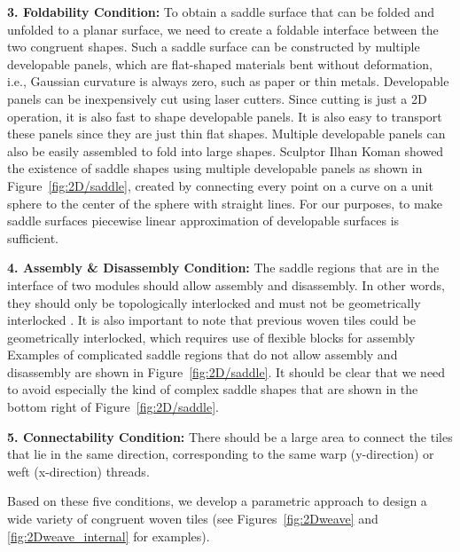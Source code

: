 \documentclass[times,twocolumn,final]{elsarticle}
\begin{document}
\noindent   \textbf{3. Foldability Condition:} To obtain a saddle surface that can be folded and unfolded to a planar surface, we need to create a foldable interface between the two congruent shapes. Such a saddle surface can be constructed by multiple developable panels, which are flat-shaped materials bent without deformation, i.e., Gaussian curvature is always zero, such as paper or thin metals. Developable panels can be inexpensively cut using laser cutters. Since cutting is just a 2D operation, it is also fast to shape developable panels.  It is also easy to transport these panels since they are just thin flat shapes. Multiple developable panels can also be easily assembled to fold into large shapes. Sculptor Ilhan Koman showed the existence of saddle shapes using multiple developable panels \cite{akgun2006developable} as shown in Figure~\ref{fig:2D/saddle}, created by connecting every point on a curve on a unit sphere to the center of the sphere with straight lines. For our purposes, to make saddle surfaces piecewise linear approximation of developable surfaces is sufficient.  

\noindent \textbf{4. Assembly \& Disassembly Condition:} The saddle regions that are in the interface of two modules should allow assembly and disassembly.  In other words, they should only be topologically interlocked \cite{djumas2017deformation} and must not be geometrically interlocked \cite{estrin2021design}. It is also important to note that previous woven tiles could be geometrically interlocked, which requires use of flexible blocks for assembly \cite{krishnamurthy2020bi,krishnamurthy2021geometrically}  Examples of complicated saddle regions that do not allow assembly and disassembly are shown in Figure~\ref{fig:2D/saddle}. It should be clear that we need to avoid especially the kind of complex saddle shapes that are shown in the bottom right of Figure~\ref{fig:2D/saddle}.

\noindent \textbf{5. Connectability Condition:} There should be a large area to connect the tiles that lie in the same direction, corresponding to the same warp (y-direction) or weft (x-direction) threads.

Based on these five conditions, we develop a parametric approach to design a wide variety of congruent woven tiles (see Figures~\ref{fig:2Dweave} and \ref{fig:2Dweave_internal} for examples). 
\end{document}
